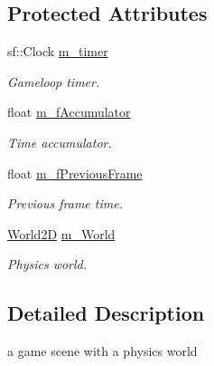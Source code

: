 \subsection*{Protected Attributes}
\begin{DoxyCompactItemize}
\item 
\hypertarget{class_game_scene_a887137cff9aa0c98abf922bffdc244dc}{sf\+::\+Clock \hyperlink{class_game_scene_a887137cff9aa0c98abf922bffdc244dc}{m\+\_\+timer}}\label{class_game_scene_a887137cff9aa0c98abf922bffdc244dc}

\begin{DoxyCompactList}\small\item\em Gameloop timer. \end{DoxyCompactList}\item 
\hypertarget{class_game_scene_ac1e2df8edcb25aaeddc2b1805e5c48d1}{float \hyperlink{class_game_scene_ac1e2df8edcb25aaeddc2b1805e5c48d1}{m\+\_\+f\+Accumulator}}\label{class_game_scene_ac1e2df8edcb25aaeddc2b1805e5c48d1}

\begin{DoxyCompactList}\small\item\em Time accumulator. \end{DoxyCompactList}\item 
\hypertarget{class_game_scene_a90073e2f9e2e404c04ccfa36039acade}{float \hyperlink{class_game_scene_a90073e2f9e2e404c04ccfa36039acade}{m\+\_\+f\+Previous\+Frame}}\label{class_game_scene_a90073e2f9e2e404c04ccfa36039acade}

\begin{DoxyCompactList}\small\item\em Previous frame time. \end{DoxyCompactList}\item 
\hypertarget{class_game_scene_acf69304d0b55c0190a70d349aba63840}{\hyperlink{class_world2_d}{World2\+D} \hyperlink{class_game_scene_acf69304d0b55c0190a70d349aba63840}{m\+\_\+\+World}}\label{class_game_scene_acf69304d0b55c0190a70d349aba63840}

\begin{DoxyCompactList}\small\item\em Physics world. \end{DoxyCompactList}\end{DoxyCompactItemize}


\subsection{Detailed Description}
a game scene with a physics world 

